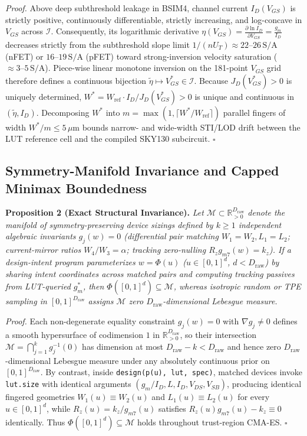 \emph{Proof.} Above deep subthreshold leakage in BSIM4, channel current $I_D(V_{GS})$ is strictly positive, continuously differentiable, strictly increasing, and log-concave in $V_{GS}$ across $\mathcal{I}$. Consequently, its logarithmic derivative $\eta(V_{GS}) = \frac{\partial \ln I_D}{\partial V_{GS}} = \frac{g_m}{I_D}$ decreases strictly from the subthreshold slope limit $1/(n U_T) \approx 22\text{--}26\,\mathrm{S/A}$ (nFET) or $16\text{--}19\,\mathrm{S/A}$ (pFET) toward strong-inversion velocity saturation ($\approx 3\text{--}5\,\mathrm{S/A}$). Piece-wise linear monotone inversion on the 181-point $V_{GS}$ grid therefore defines a continuous bijection $\tilde{\eta} \mapsto V_{GS}^* \in \mathcal{I}$. Because $J_D(V_{GS}^*) > 0$ is uniquely determined, $W^* = W_{\text{ref}} \cdot I_D / J_D(V_{GS}^*) > 0$ is unique and continuous in $(\tilde{\eta}, I_D)$. Decomposing $W^*$ into $m = \max(1, \lceil W^* / W_{\text{ref}} \rceil)$ parallel fingers of width $W^* / m \le 5\,\mu\mathrm{m}$ bounds narrow- and wide-width STI/LOD drift between the LUT reference cell and the compiled SKY130 subcircuit. \hfill $\square$

\subsection{Symmetry-Manifold Invariance and Capped Minimax Boundedness}
\textbf{Proposition 2 (Exact Structural Invariance).} \emph{Let $\mathcal{M} \subset \mathbb{R}_{>0}^{D_{\text{raw}}}$ denote the manifold of symmetry-preserving device sizings defined by $k \ge 1$ independent algebraic invariants $g_j(w) = 0$ (differential pair matching $W_1 = W_2, L_1 = L_2$; current-mirror ratios $W_4 / W_3 = \alpha$; tracking zero-nulling $R_z g_{m7}(w) = k_z$). If a design-intent program parameterizes $w = \Phi(u)$ ($u \in [0,1]^d$, $d < D_{\text{raw}}$) by sharing intent coordinates across matched pairs and computing tracking passives from LUT-queried $g_m^*$, then $\Phi([0,1]^d) \subseteq \mathcal{M}$, whereas isotropic random or TPE sampling in $[0,1]^{D_{\text{raw}}}$ assigns $\mathcal{M}$ zero $D_{\text{raw}}$-dimensional Lebesgue measure.}

\emph{Proof.} Each non-degenerate equality constraint $g_j(w) = 0$ with $\nabla g_j \neq 0$ defines a smooth hypersurface of codimension $1$ in $\mathbb{R}_{>0}^{D_{\text{raw}}}$, so their intersection $\mathcal{M} = \bigcap_{j=1}^k g_j^{-1}(0)$ has dimension at most $D_{\text{raw}} - k < D_{\text{raw}}$ and hence zero $D_{\text{raw}}$-dimensional Lebesgue measure under any absolutely continuous prior on $[0,1]^{D_{\text{raw}}}$. By contrast, inside \texttt{design(p(u), lut, spec)}, matched devices invoke \texttt{lut.size} with identical arguments $(g_m/I_D, L, I_D, V_{DS}, V_{SB})$, producing identical fingered geometries $W_1(u) \equiv W_2(u)$ and $L_1(u) \equiv L_2(u)$ for every $u \in [0,1]^d$, while $R_z(u) = k_z / g_{m7}(u)$ satisfies $R_z(u) g_{m7}(u) - k_z \equiv 0$ identically. Thus $\Phi([0,1]^d) \subseteq \mathcal{M}$ holds throughout trust-region CMA-ES. \hfill $\square$


